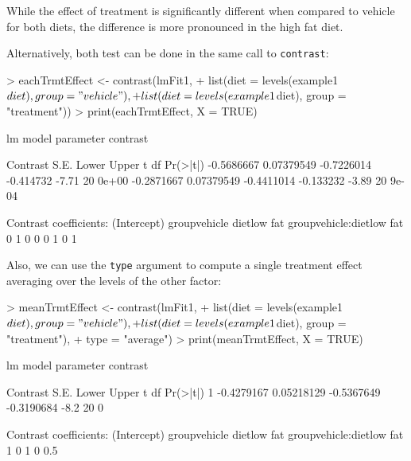 \documentclass[12pt]{article}
\newcommand{\code}[1]{\mbox{\footnotesize\color{darkblue}\texttt{#1}}}
\renewenvironment{Schunk}{\vspace{\topsep}}{\vspace{\topsep}}
\begin{document}
While the effect of treatment is significantly different when compared to vehicle for both diets, the difference is more pronounced in the high fat diet.

Alternatively, both test can be done in the same call to \code{contrast}:
\begin{Schunk}
\begin{Sinput}
> eachTrmtEffect <- contrast(lmFit1, 
+                            list(diet = levels(example1$diet), group = "vehicle"),
+                            list(diet = levels(example1$diet), group = "treatment"))  
> print(eachTrmtEffect, X = TRUE)
\end{Sinput}
\begin{Soutput}
lm model parameter contrast

   Contrast       S.E.      Lower     Upper     t df Pr(>|t|)
 -0.5686667 0.07379549 -0.7226014 -0.414732 -7.71 20    0e+00
 -0.2871667 0.07379549 -0.4411014 -0.133232 -3.89 20    9e-04

Contrast coefficients:
 (Intercept) groupvehicle dietlow fat groupvehicle:dietlow fat
           0            1           0                        0
           0            1           0                        1
\end{Soutput}
\end{Schunk}


Also, we can use the \code{type} argument to compute a single treatment effect averaging over the levels of the other factor:
\begin{Schunk}
\begin{Sinput}
> meanTrmtEffect <- contrast(lmFit1, 
+                            list(diet = levels(example1$diet), group = "vehicle"),
+                            list(diet = levels(example1$diet), group = "treatment"),
+                            type = "average")  
> print(meanTrmtEffect, X = TRUE)
\end{Sinput}
\begin{Soutput}
lm model parameter contrast

    Contrast       S.E.      Lower      Upper    t df Pr(>|t|)
1 -0.4279167 0.05218129 -0.5367649 -0.3190684 -8.2 20        0

Contrast coefficients:
  (Intercept) groupvehicle dietlow fat groupvehicle:dietlow fat
1           0            1           0                      0.5
\end{Soutput}
\end{Schunk}
\end{document}
